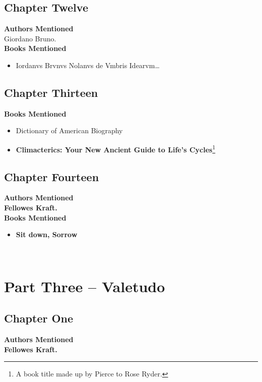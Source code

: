 \documentclass[12pt,makeidx]{extreport}
\newcommand\fleuron{\begin{turn}{45}\Large \ding{166}\end{turn}}
\newcommand\doublefleuron{%
	\reflectbox{\fleuron}\AC\staveXLIX\reflectbox{\AC}\fleuron}
\newcommand\fleuronbar{%
	{\huge\LinearACCCXIII}\xrfill[1.3ex]{1pt}\doublefleuron\xrfill[1.3ex]{1pt}\reflectbox{\huge\LinearACCCXIII}}
\newcommand\nbvspace[1][3]{\vspace*{\stretch{#1}}}
\begin{document}
\section{Chapter Twelve}
\textbf{Authors Mentioned}\\
Giordano Bruno.
\\

\hspace{-1.5em}\textbf{Books Mentioned}
\begin{itemize}
\item Iordanvs Brvnvs Nolanvs de Vmbris Idearvm\ldots \parencite{Bruno1582}
\end{itemize}

\section{Chapter Thirteen}
\textbf{Books Mentioned}
\begin{itemize}
\item Dictionary of American Biography \parencite{LearnedSocieties1943}
\item \textbf{Climacterics: Your New Ancient Guide to Life’s Cycles}\footnote{A book title made up by Pierce to Rose Ryder.} \parencite{Muchon.d}
\end{itemize}

\section{Chapter Fourteen}
\textbf{Authors Mentioned}\\
\textbf{Fellowes Kraft.}
\\

\hspace{-1.5em}\textbf{Books Mentioned}
\begin{itemize}
\item \textbf{Sit down, Sorrow} \parencite{Craft1960}
\end{itemize}

\begin{center}
\vfill
\shadowoffset{1pt}
\\
\nbvspace[1]
\end{center}

\chapter{Part Three -- Valetudo}
\section{Chapter One}
\textbf{Authors Mentioned}\\
\textbf{Fellowes Kraft.}
\\
\end{document}
